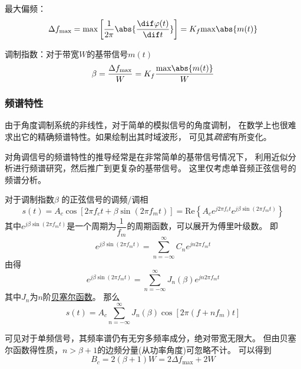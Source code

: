     最大偏频：
    \begin{equation}
        \Delta f_{\text{max}}=\text{max}\left[\frac{1}{2\pi}\abs{\frac{\dif \varphi(t)}{\dif t}}\right]=K_f\text{max}\abs{m(t)}
    \end{equation}

    调制指数：对于带宽$W$的基带信号$m(t)$
    \begin{eqnarray}
        \beta=\frac{\Delta f_{\text{max}}}{W}=K_f\frac{\text{max}\abs{m(t)}}{W}
    \end{eqnarray}

    \subsubsection{频谱特性}
    由于角度调制系统的非线性，对于简单的模拟信号的角度调制，
    在数学上也很难求出它的精确频谱特性。如果绘制出其时域波形，
    可见其\emph{疏密}有所变化。

    对角调信号的频谱特性的推导经常是在非常简单的基带信号情况下，
    利用近似分析进行频谱研究，然后推广到更复杂的基带信号。
    这里仅考虑单音频正弦信号的频谱分析。

    对于调制指数$\beta$ 的正弦信号的调频/调相
    \begin{equation}
        s(t)=A_c\cos\left[2\pi f_ct+\beta\sin(2\pi f_mt)\right]=\text{Re}\left\{A_ce^{j2\pi f_ct}e^{j\beta\sin(2\pi f_mt)}\right\}
    \end{equation}
    其中$e^{j\beta\sin(2\pi f_mt)}$是一个周期为$\dfrac{1}{f_m}$的周期函数，可以展开为傅里叶级数。
    即
    \begin{equation}
        e^{j\beta\sin(2\pi f_mt)}=\sum_{n=-\infty}^{\infty}C_ne^{jn2\pi f_mt}
    \end{equation}
    由得
    \begin{equation}
        e^{j\beta\sin(2\pi f_mt)}=\sum_{n=-\infty}^{\infty}J_n(\beta)e^{jn2\pi f_mt}
    \end{equation}
    其中$J_n$为$n$阶\href{https://zh.wikipedia.org/wiki/%E8%B4%9D%E5%A1%9E%E5%B0%94%E5%87%BD%E6%95%B0}{贝塞尔函数}。%
    那么
    \begin{equation}
        s(t)=A_c\sum_{n=-\infty}^{\infty}J_n(\beta)\cos[2\pi(f+nf_m)t]
    \end{equation}

    可见对于单频信号，其频率谱仍有无穷多频率成分，绝对带宽无限大。
    但由贝塞尔函数得性质，$n>\beta+1$的边频分量(从功率角度)可忽略不计。
    可以得到
    \begin{equation}\label{eq:Carson}
        B_c=2(\beta+1)W=2\Delta f_{\text{max}}+2W
    \end{equation}

